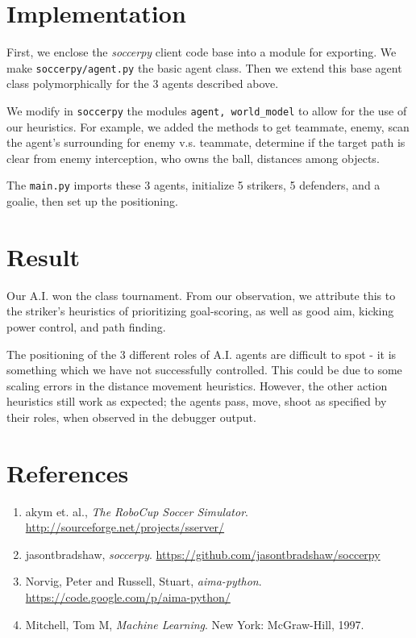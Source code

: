 \documentclass[12pt]{article}  %
\begin{document}
\section{Implementation}

First, we enclose the \emph{soccerpy} client code base into a module for exporting. We make {\tt soccerpy/agent.py} the basic agent class. Then we extend this base agent class polymorphically for the 3 agents described above.

We modify in {\tt soccerpy} the modules {\tt agent, world\_model} to allow for the use of our heuristics. For example, we added the methods to get teammate, enemy, scan the agent's surrounding for enemy v.s. teammate, determine if the target path is clear from enemy interception, who owns the ball, distances among objects.

The {\tt main.py} imports these 3 agents, initialize 5 strikers, 5 defenders, and a goalie, then set up the positioning.






\section{Result}

Our A.I. won the class tournament. From our observation, we attribute this to the striker's heuristics of prioritizing goal-scoring, as well as good aim, kicking power control, and path finding. 

The positioning of the 3 different roles of A.I. agents are difficult to spot - it is something which we have not successfully controlled. This could be due to some scaling errors in the distance movement heuristics. However, the other action heuristics still work as expected; the agents pass, move, shoot as specified by their roles, when observed in the debugger output.



\section{References}


\begin{enumerate}

\item akym et. al., \emph{The RoboCup Soccer Simulator}. \url{http://sourceforge.net/projects/sserver/}\label{sim}

\item jasontbradshaw, \emph{soccerpy}. \url{https://github.com/jasontbradshaw/soccerpy}\label{client}

\item Norvig, Peter and Russell, Stuart, \emph{aima-python}. \url{https://code.google.com/p/aima-python/}\label{aima}

\item Mitchell, Tom M, \emph{Machine Learning}. New York: McGraw-Hill, 1997.\label{Mitchell}



\end{enumerate}
\end{document}
